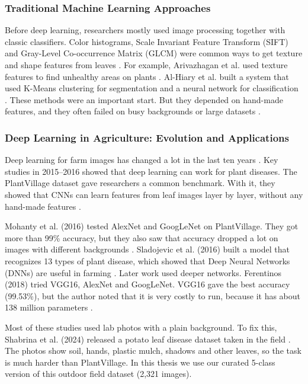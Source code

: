 \subsubsection{Traditional Machine Learning Approaches}
Before deep learning, researchers mostly used image processing together with classic classifiers. Color histograms, Scale Invariant Feature Transform (SIFT) and Gray-Level Co-occurrence Matrix (GLCM) were common ways to get texture and shape features from leaves \cite{pujari2016image}. For example, Arivazhagan et al. used texture features to find unhealthy areas on plants \cite{arivazhagan2013detection}. Al-Hiary et al. built a system that used K-Means clustering for segmentation and a neural network for classification \cite{alhiary2011fast}. These methods were an important start. But they depended on hand-made features, and they often failed on busy backgrounds or large datasets \cite{ngugi2021recent}.

\subsubsection{Deep Learning in Agriculture: Evolution and Applications}
Deep learning for farm images has changed a lot in the last ten years \cite{mohanty2016using}. Key studies in 2015--2016 showed that deep learning can work for plant diseases. The PlantVillage dataset gave researchers a common benchmark. With it, they showed that CNNs can learn features from leaf images layer by layer, without any hand-made features \cite{hughes2015open}.

Mohanty et al. (2016) tested AlexNet and GoogLeNet on PlantVillage. They got more than 99\% accuracy, but they also saw that accuracy dropped a lot on images with different backgrounds \cite{mohanty2016using}. Sladojevic et al. (2016) built a model that recognizes 13 types of plant disease, which showed that Deep Neural Networks (DNNs) are useful in farming \cite{sladojevic2016deep}. Later work used deeper networks. Ferentinos (2018) tried VGG16, AlexNet and GoogLeNet. VGG16 gave the best accuracy (99.53\%), but the author noted that it is very costly to run, because it has about 138 million parameters \cite{ferentinos2018deep}.

Most of these studies used lab photos with a plain background. To fix this, Shabrina et al. (2024) released a potato leaf disease dataset taken in the field \cite{shabrina2024novel}. The photos show soil, hands, plastic mulch, shadows and other leaves, so the task is much harder than PlantVillage. In this thesis we use our curated 5-class version of this outdoor field dataset (2,321 images).

